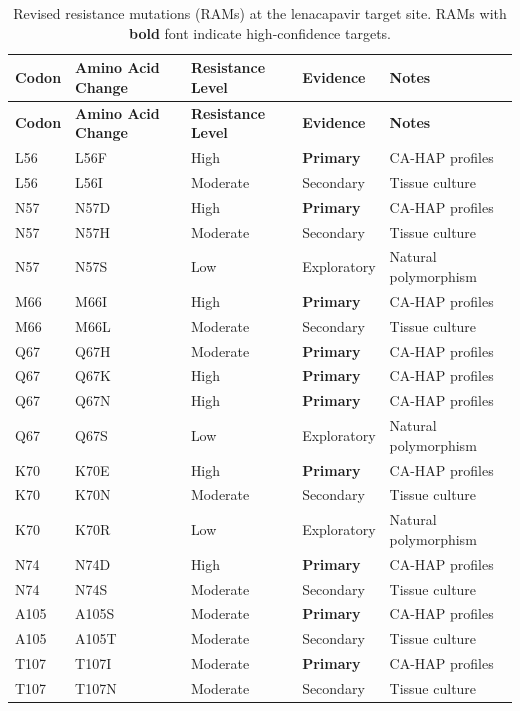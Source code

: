 \documentclass[12pt]{article}
\begin{document}
\begin{longtable}{p{2cm}p{3cm}p{3cm}p{2cm}p{4cm}}
    \caption{Revised resistance mutations (RAMs) at the lenacapavir target site.
    RAMs with \textbf{bold} font indicate high-confidence targets.}\label{tab:ram_dictionary}\\
    \toprule
    \textbf{Codon} & \textbf{Amino Acid Change} & \textbf{Resistance Level} & \textbf{Evidence} & \textbf{Notes} \\
    \midrule
    \endfirsthead
    \toprule
    \textbf{Codon} & \textbf{Amino Acid Change} & \textbf{Resistance Level} & \textbf{Evidence} & \textbf{Notes} \\
    \midrule
    \endhead
    \bottomrule
    \endfoot
    L56 & L56F & High & \textbf{Primary} & CA-HAP profiles \\
    L56 & L56I & Moderate & Secondary & Tissue culture \\
    N57 & N57D & High & \textbf{Primary} & CA-HAP profiles \\
    N57 & N57H & Moderate & Secondary & Tissue culture \\
    N57 & N57S & Low & Exploratory & Natural polymorphism \\
    M66 & M66I & High & \textbf{Primary} & CA-HAP profiles \\
    M66 & M66L & Moderate & Secondary & Tissue culture \\
    Q67 & Q67H & Moderate & \textbf{Primary} & CA-HAP profiles \\
    Q67 & Q67K & High & \textbf{Primary} & CA-HAP profiles \\
    Q67 & Q67N & High & \textbf{Primary} & CA-HAP profiles \\
    Q67 & Q67S & Low & Exploratory & Natural polymorphism \\
    K70 & K70E & High & \textbf{Primary} & CA-HAP profiles \\
    K70 & K70N & Moderate & Secondary & Tissue culture \\
    K70 & K70R & Low & Exploratory & Natural polymorphism \\
    N74 & N74D & High & \textbf{Primary} & CA-HAP profiles \\
    N74 & N74S & Moderate & Secondary & Tissue culture \\
    A105 & A105S & Moderate & \textbf{Primary} & CA-HAP profiles \\
    A105 & A105T & Moderate & Secondary & Tissue culture \\
    T107 & T107I & Moderate & \textbf{Primary} & CA-HAP profiles \\
    T107 & T107N & Moderate & Secondary & Tissue culture \\
    \bottomrule
\end{longtable}
\end{document}

